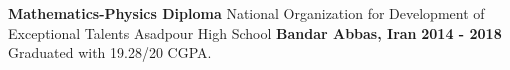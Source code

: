 \begin{cventries}
  \cventry
    {\textbf{Mathematics-Physics Diploma}} %
    {National Organization for Development of Exceptional Talents Asadpour High School} %
    {\textbf{Bandar Abbas, Iran}} %
    {\textbf{2014 - 2018}} %
    {
        Graduated with 19.28/20 CGPA.
    }
\end{cventries}
